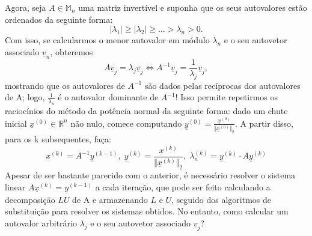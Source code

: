 \documentclass[../numerical_methods.tex]{subfiles}
\begin{document}
Agora, seja \(A\in \mathbb{M}_{n}\) uma matriz invertível e suponha que os seus autovalores estão ordenados da seguinte forma:
\[
	| \lambda_1 | \geq | \lambda_2 | \geq \dotsc > \lambda_{n} > 0.
\]
Com isso, se calcularmos o menor autovalor em módulo \(\lambda_{n}\) e o seu autovetor associado \(\underline{v}_{n}\), obteremos
\[
	A \underline{v}_{j} = \lambda_{j}\underline{v}_{j} \Longleftrightarrow A^{-1}\underline{v}_{j} = \frac{1}{\lambda_{j}}\underline{v}_{j},
\]
mostrando que os autovalores de \(A^{-1}\) são dados pelas recíprocas dos autovalores de A; logo, \(\frac{1}{\lambda_{n}}\) é o autovalor dominante de \(A^{-1}\)! Isso permite repetirmos os raciocínios do método da potência normal da seguinte forma: dado um chute inicial \(\underline{x}^{(0)}\in \mathbb{R}^{n}\) não nulo, comece computando \(\underline{y}^{(0)}=\frac{\underline{x}^{(0)}}{\Vert \underline{x}^{(0)} \Vert_{2}}\). A partir disso, para os k subsequentes, faça:
\[
	\boxed{\underline{x}^{(k)} = A^{-1}\underline{y}^{(k-1)},\; \underline{y}^{(k)} = \frac{\underline{x}^{(k)}}{\Vert \underline{x}^{(k)} \Vert_{2}},\; \lambda_{n}^{(k)} = \underline{y}^{(k)}\cdot A \underline{y}^{(k)}}
\]
Apesar de ser bastante parecido com o anterior, é necessário resolver o sistema linear \(A\underline{x}^{(k)} = \underline{y}^{(k-1)}\) a cada iteração, que pode ser feito calculando a decomposição \(LU\) de A e armazenando \(L\) e \(U\), seguido dos algoritmos de substituição para resolver os sistemas obtidos. No entanto, como calcular um autovalor arbitrário \(\lambda_{j}\) e o seu autovetor associado \(\underline{v}_{j}\)?
\end{document}
